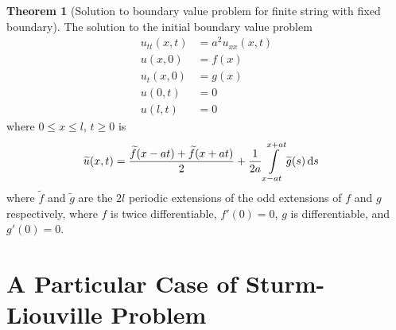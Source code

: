 \documentclass[titlepage, fleqn, a4paper, 12pt, twoside]{article}
\theoremstyle{definition}
\theoremstyle{theorem}
\newtheorem{theorem}{Theorem}
\renewcommand{\tilde}{\widetilde}
\begin{document}
\begin{theorem}[Solution to boundary value problem for finite string with fixed boundary]
	The solution to the initial boundary value problem
	\begin{align*}
		u_{t t}(x,t) &= a^2 u_{x x}(x,t)\\
		u(x,0) &= f(x)\\
		u_t(x,0) &= g(x)\\
		u(0,t) &= 0\\
		u(l,t) &= 0
	\end{align*}
	where $0 \le x \le l$, $t \ge 0$ is
	\begin{align*}
		\tilde{u}(x,t) &= \frac{\tilde{f}(x - a t) + \tilde{f}(x + a t)}{2} + \frac{1}{2 a} \int\limits_{x - a t}^{x + a t} \tilde{g}(s) \dif s
	\end{align*}
	where $\tilde{f}$ and $\tilde{g}$ are the $2 l$ periodic extensions of the odd extensions of $f$ and $g$ respectively, where $f$ is twice differentiable, $f'(0) = 0$, $g$ is differentiable, and $g'(0) = 0$.
	\label{thm:Solution_to_initial_boundary_value_problem_for_finite_string_with_free_boundary}
\end{theorem}

\section{A Particular Case of Sturm-Liouville Problem}
\end{document}
